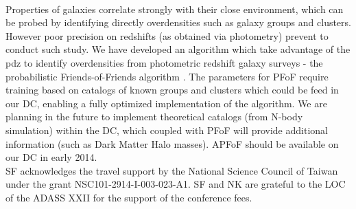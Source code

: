 \\
Properties of galaxies correlate strongly with their close environment, which can be probed by identifying directly overdensities such as galaxy groups and clusters. However poor precision on redshifts (as obtained via photometry) prevent to conduct such study. We have developed an algorithm which take advantage of the pdz to identify overdensities from photometric redshift galaxy surveys - the probabilistic Friends-of-Friends algorithm \citep[PFoF -][]{pfof}. The parameters for PFoF require training based on catalogs of known groups and clusters which could be feed in our DC, enabling a fully optimized implementation of the algorithm. We are planning in the future to implement theoretical catalogs (from N-body simulation) within the DC, which coupled with PFoF will provide additional information (such as Dark Matter Halo masses). APFoF should be available on our DC in early 2014.\\


\acknowledgements SF acknowledges the travel support by the National Science Council of Taiwan under the grant NSC101-2914-I-003-023-A1. SF and NK are grateful to the LOC of the ADASS XXII for the support of the conference fees.


